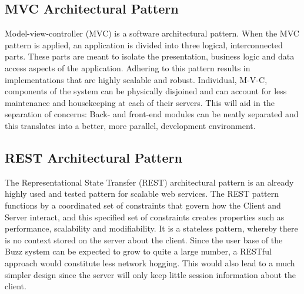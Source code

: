 \documentclass[12pt]{article}
\begin{document}
\subsection{MVC Architectural Pattern}
Model-view-controller (MVC) is a software architectural pattern. When the MVC pattern is applied, an application is divided into three logical, interconnected parts. These parts are meant to isolate the presentation, business logic and data access aspects of the application. Adhering to this pattern results in implementations that are highly scalable and robust. Individual, M-V-C, components of the system can be physically disjoined and can account for less maintenance and housekeeping at each of their servers. This will aid in the separation of concerns: Back- and front-end modules can be neatly separated and this translates into a better, more parallel, development environment.

\subsection{REST Architectural Pattern}
The Representational State Transfer (REST) architectural pattern is an already highly used and tested pattern for scalable web services.
The REST pattern functions by a coordinated set of constraints that govern how the Client and Server interact, and this specified set of constraints creates properties such as performance, scalability and modifiability. 
It is a stateless pattern, whereby there is no context stored on the server about the client.
Since the user base of the Buzz system can be expected to grow to quite a large number, a RESTful approach would constitute less network hogging. This would also lead to a much simpler design since the server will only keep little session information about the client.
\end{document}
